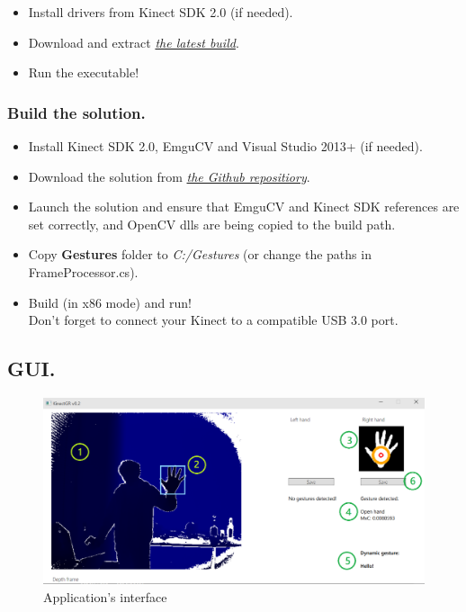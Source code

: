 \documentclass[a4paper,11pt,oneside]{article}
\begin{document}
\begin{itemize}
\item Install drivers from Kinect SDK 2.0 (if needed).
\item Download and extract \href{https://github.com/dmitryfd/KinectGR}{\textit{the latest build}}.
\item Run the executable!
\end{itemize}

\subsubsection{Build the solution.}

\begin{itemize}
\item Install Kinect SDK 2.0, EmguCV and Visual Studio 2013+ (if needed).
\item Download the solution from \href{https://github.com/dmitryfd/KinectGR}{\textit{the Github repositiory}}.
\item Launch the solution and ensure that EmguCV and Kinect SDK references are set correctly, and OpenCV dlls are being copied to the build path. 
\item Copy \textbf{Gestures} folder to \textit{C:/Gestures} (or change the paths in FrameProcessor.cs).
\item Build (in x86 mode) and run! \\Don't forget to connect your Kinect to a compatible USB 3.0 port.
\end{itemize}

\subsection{GUI.}

  \begin{figure}[H]
  \centering
  \includegraphics[scale=1]{app-gui.png}
\caption{Application's interface}
\end{figure}
\end{document}
